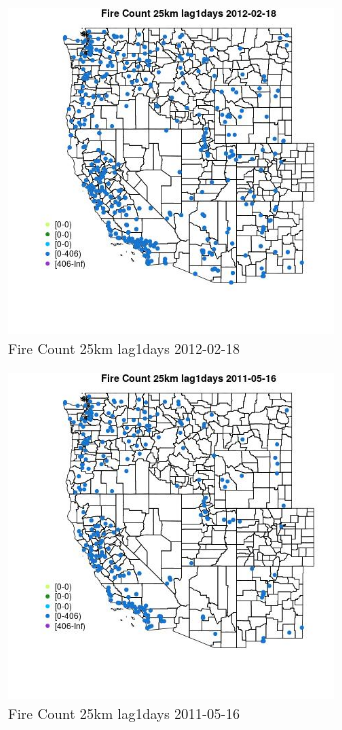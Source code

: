 \begin{figure} 
\centering  
\includegraphics[width=0.77\textwidth]{Code_Outputs/Report_ML_input_PM25_Step4_part_f_de_duplicated_aves_prioritize_24hr_obswNAs_MapObsFire_Count_25km_lag1days2012-02-18.jpg} 
\caption{\label{fig:Report_ML_input_PM25_Step4_part_f_de_duplicated_aves_prioritize_24hr_obswNAsMapObsFire_Count_25km_lag1days2012-02-18}Fire Count 25km lag1days 2012-02-18} 
\end{figure} 
 

\begin{figure} 
\centering  
\includegraphics[width=0.77\textwidth]{Code_Outputs/Report_ML_input_PM25_Step4_part_f_de_duplicated_aves_prioritize_24hr_obswNAs_MapObsFire_Count_25km_lag1days2011-05-16.jpg} 
\caption{\label{fig:Report_ML_input_PM25_Step4_part_f_de_duplicated_aves_prioritize_24hr_obswNAsMapObsFire_Count_25km_lag1days2011-05-16}Fire Count 25km lag1days 2011-05-16} 
\end{figure} 
 

